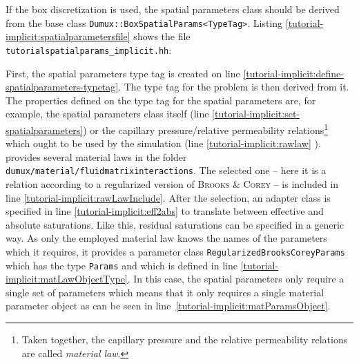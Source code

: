 If the box discretization is used, the spatial parameters class
should be derived from the base class
\texttt{Dumux::BoxSpatialParams<TypeTag>}. Listing
\ref{tutorial-implicit:spatialparametersfile} shows the file \\
\verb+tutorialspatialparams_implicit.hh+:

\begin{lst}\label{tutorial-implicit:spatialparametersfile} \mbox{}

\end{lst}

First, the spatial parameters type tag is created on line
\ref{tutorial-implicit:define-spatialparameters-typetag}. The type tag
for the problem is then derived from it. The \Dumux properties defined on
the type tag for the spatial parameters are, for example, the spatial
parameters class itself (line
\ref{tutorial-implicit:set-spatialparameters}) or the capillary
pressure/relative permeability relations\footnote{Taken together, the
  capillary pressure and the relative permeability relations are
  called \textit{material law}.} which ought to be used by the
simulation (line
\ref{tutorial-implicit:rawlaw} \label{tutorial-implicit:materialLaw}).
\Dumux provides several material laws in the folder
\verb+dumux/material/fluidmatrixinteractions+.  The selected one --
here it is a relation according to a regularized version of
\textsc{Brooks} \& \textsc{Corey} -- is included in line
\ref{tutorial-implicit:rawLawInclude}.
After the selection, an adapter class is specified in line \ref{tutorial-implicit:eff2abs} to
translate between effective and absolute saturations. Like this,
residual saturations can be specified in a generic way.  As only the employed
material law knows the names of the parameters which it
requires, it provides a parameter class
\texttt{RegularizedBrooksCoreyParams} which has the type
\texttt{Params} and which is defined in line
\ref{tutorial-implicit:matLawObjectType}. In this case, the spatial
parameters only require a single set of parameters which means that it
only requires a single material parameter object as can be seen in
line~\ref{tutorial-implicit:matParamsObject}.

